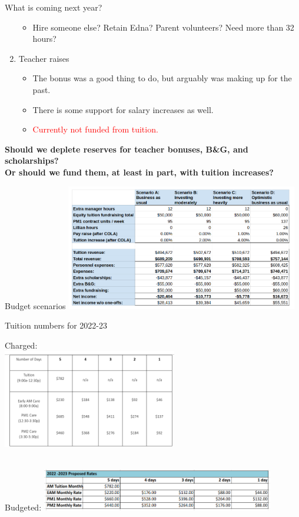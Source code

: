 \documentclass[8pt]{beamer}
\begin{document}
\begin{frame}{What is coming next year?}
\begin{enumerate}
\begin{itemize}
        \item Hire someone else?  Retain Edna?  Parent volunteers?  Need more than 32 hours?
    \end{itemize}
%
\item Teacher raises
\pause
    \begin{itemize}
        \item The bonus was a good thing to do, but arguably was making up for the past.
        \item There is some support for salary increases as well.
        \item \textcolor{red}{Currently not funded from tuition.}
    \end{itemize}
\end{enumerate}
%
\pause
\textbf{Should we deplete reserves for teacher bonuses, B\&G, and scholarships?}\\
\textbf{Or should we fund them, at least in part, with tuition increases?}

\end{frame}


\begin{frame}{Budget scenarios}
\includegraphics[width=4in]{budget_scenarios.png}
\end{frame}

\begin{frame}{Tuition numbers for 2022-23}

\begin{center}
Charged:\\
\includegraphics[width=3in]{actual_tuition_2223.png}

\hrulefill\\
Budgeted:
\includegraphics[width=4in]{budgeted_tuition_2223.png}
\end{center}
\end{frame}
\end{document}
